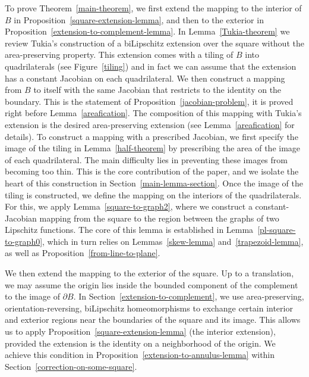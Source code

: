 \documentclass[12pt]{article}
\theoremstyle{definition}
\begin{document}
To prove Theorem~\ref{main-theorem}, we first extend the mapping to the interior of $B$ in Proposition~\ref{square-extension-lemma}, and then to the exterior in Proposition~\ref{extension-to-complement-lemma}. In Lemma~\ref{Tukia-theorem} we review Tukia's construction of a biLipschitz extension over the square without the area-preserving property. This extension comes with a tiling of $B$ into quadrilaterals (see Figure~\ref{tiling}) and in fact we can assume that the extension has a constant Jacobian on each quadrilateral. We then construct a mapping from $B$ to itself with the same Jacobian that restricts to the identity on the boundary. This is the statement of Proposition~\ref{jacobian-problem}, it is proved right before Lemma~\ref{areafication}. The composition of this mapping with Tukia's extension is the desired area-preserving extension (see Lemma~\ref{areafication} for details). To construct a mapping with a prescribed Jacobian, we first specify the image of the tiling in Lemma~\ref{half-theorem}  by prescribing the area of the image of each quadrilateral. The main difficulty lies in preventing these images from becoming too thin. This is the core contribution of the paper, and we isolate the heart of this construction in Section~\ref{main-lemma-section}. Once the image of the tiling is constructed, we define the mapping on the interiors of the quadrilaterals. For this, we apply Lemma~\ref{square-to-graph2}, where we construct a constant-Jacobian mapping from the square to the region between the graphs of two Lipschitz functions. The core of this lemma is established in Lemma~\ref{pl-square-to-graph0}, which in turn relies on Lemmas~\ref{skew-lemma} and~\ref{trapezoid-lemma}, as well as Proposition~\ref{from-line-to-plane}.

We then extend the mapping to the exterior of the square. Up to a translation, we may assume the origin lies inside the bounded component of the complement to the image of $\partial B.$ In Section~\ref{extension-to-complement}, we use area-preserving, orientation-reversing, biLipschitz homeomorphisms to exchange certain interior and exterior regions near the boundaries of the square and its image. This allows us to apply Proposition~\ref{square-extension-lemma} (the interior extension), provided the extension is the identity on a neighborhood of the origin. We achieve this condition in Proposition~\ref{extension-to-annulus-lemma} within Section~\ref{correction-on-some-square}.
\end{document}
